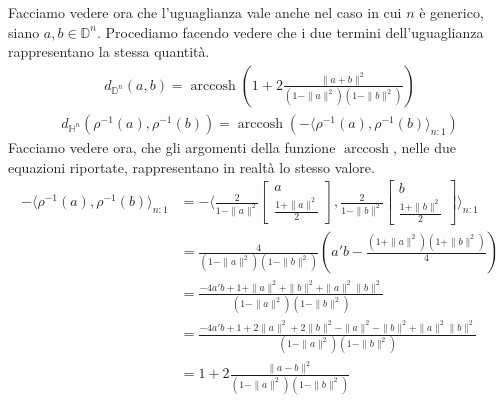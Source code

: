 \documentclass[a4paper, 12pt]{article}
\DeclareMathOperator\arccosh{arccosh}
\begin{document}
\\\\
Facciamo vedere ora che l'uguaglianza vale anche nel caso in cui $n$ è generico, siano $a, b \in \mathbb{D}^n$. Procediamo facendo vedere che i due termini dell'uguaglianza rappresentano la stessa quantità.\\
\begin{equation*}\begin{gathered}
d_{\mathbb{D}^n}(a,b) = \arccosh(1 + 2\frac{\| a + b \|^2}{(1 - \| a \|^2)(1 - \| b \|^2)})
\end{gathered}\end{equation*}
\begin{equation*}\begin{gathered}
d_{\mathbb{H}^n}(\rho^{-1}(a),\rho^{-1}(b)) = \arccosh(- \langle \rho^{-1}(a),\rho^{-1}(b) \rangle_{n:1})
\end{gathered}\end{equation*}
Facciamo vedere ora, che gli argomenti della funzione $\arccosh$, nelle due equazioni riportate, rappresentano in realtà lo stesso valore.
\begin{equation*}\begin{split}
- \langle \rho^{-1}(a),\rho^{-1}(b) \rangle_{n:1} &= - \langle \frac{2}{1 - \| a \|^2} \begin{bmatrix} a \\ \frac{1 + \| a \|^2}{2} \end{bmatrix}, \frac{2}{1 - \| b \|^2} \begin{bmatrix} b \\ \frac{1 + \| b \|^2}{2} \end{bmatrix} \rangle_{n:1}\\
&=\frac{4}{(1 - \| a \|^2)(1 - \| b \|^2)} \left( a'b - \frac{(1 + \| a \|^2)(1 + \| b \|^2)}{4} \right)\\
&=\frac{-4a'b + 1 + \| a \|^2 + \| b \|^2 + \| a \|^2 \| b \|^2}{(1 - \| a \|^2)(1 - \| b \|^2)}\\
&=\frac{-4a'b + 1 + 2\| a \|^2 + 2\| b \|^2 - \| a \|^2 - \| b \|^2 + \| a \|^2 \| b \|^2}{(1 - \| a \|^2)(1 - \| b \|^2)}\\
&=1 + 2 \frac{\| a - b \|^2}{(1 - \| a \|^2)(1 - \| b \|^2)}
\end{split}\end{equation*}
\end{document}
